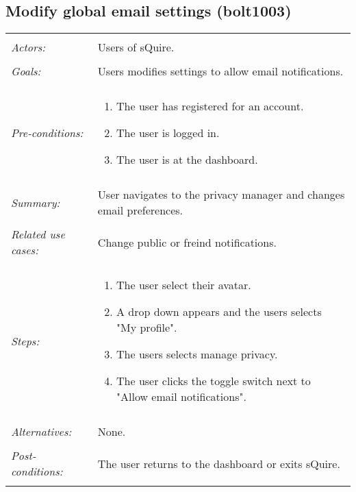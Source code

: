 \documentclass[11pt]{report}
\begin{document}
\subsection{Modify global email settings (bolt1003)}
\begin{tabular}{ p{2cm} p{12cm} }
 \hline
 \\
 \textit{Actors:} & Users of sQuire. \\ 
 \\
 \textit{Goals:} & Users modifies settings to allow email notifications. \\
 \\
 \textit{Pre-conditions:} & \begin{enumerate}
  \item The user has registered for an account.
  \item The user is logged in.
  \item The user is at the dashboard.
 \end{enumerate} \\
 \\
 \textit{Summary:} & User navigates to the privacy manager and changes email preferences.\\ 
 \\
 \textit{Related use cases:} & Change public or freind notifications. \\ 
 \\
 \textit{Steps:} & \begin{enumerate}
  \item The user select their avatar.
  \item A drop down appears and the users selects "My profile".
  \item The users selects manage privacy.
  \item The user clicks the toggle switch next to "Allow email notifications".
 \end{enumerate} \\
 \\
 \textit{Alternatives:} & None. \\
 \\
 \textit{Post-conditions:} & The user returns to the dashboard or exits sQuire. \\
 \\
\hline
\end{tabular}
\end{document}
